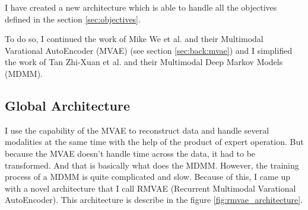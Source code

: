 \documentclass[12pt]{report}
\begin{document}
I have created a new architecture which is able to handle all the objectives defined in the section \ref{sec:objectives}.

To do so, I continued the work of Mike We et al. \cite{wu_multimodal_2018} and their Multimodal Varational AutoEncoder (MVAE) (see section \ref{sec:back:mvae}) and I simplified the work of Tan Zhi-Xuan et al. \cite{tan_factorized_2019} and their Multimodal Deep Markov Models (MDMM).

\subsection{Global Architecture}

I use the capability of the MVAE to reconstruct data and handle several modalities at the same time with the help of the product of expert operation.
But because the MVAE doesn't handle time across the data, it had to be transformed.
And that is basically what does the MDMM.
However, the training process of a MDMM is quite complicated and slow.
Because of this, I came up with a novel architecture that I call RMVAE (Recurrent Multimodal Varational AutoEncoder).
This architecture is describe in the figure \ref{fig:rmvae_architecture}.
\end{document}
